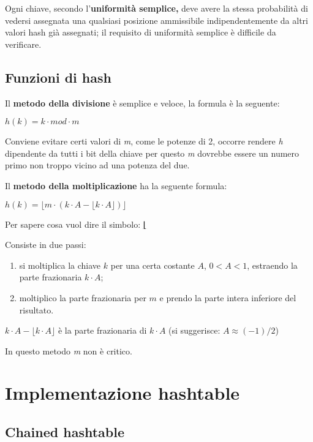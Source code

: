 Ogni chiave, secondo l'\textbf{uniformità semplice,} deve avere la
stessa probabilità di vedersi assegnata una qualsiasi posizione
ammissibile indipendentemente da altri valori hash già assegnati; il
requisito di uniformità semplice è difficile da verificare.

\subsection{Funzioni di hash}\label{funzioni-di-hash}

Il \textbf{metodo della divisione} è semplice e veloce, la formula è la
seguente:

\(h(k) = k \cdot mod \cdot m\)

Conviene evitare certi valori di \emph{m}, come le potenze di 2, occorre
rendere \emph{h} dipendente da tutti i bit della chiave per questo
\emph{m} dovrebbe essere un numero primo non troppo vicino ad una
potenza del due.

Il \textbf{metodo della moltiplicazione} ha la seguente formula:

\(h(k) = \lfloor m \cdot (k \cdot A - \lfloor k \cdot A\rfloor)\rfloor\)

Per sapere cosa vuol dire il simbolo:
\href{https://it.wikipedia.org/wiki/Parte_intera}{⌊}

Consiste in due passi:

\begin{enumerate}
\def\labelenumi{\arabic{enumi}.}
\item
  si moltiplica la chiave \(k\) per una certa costante \(A\),
  \(0 < A < 1\), estraendo la parte frazionaria \(k \cdot A\);
\item
  moltiplico la parte frazionaria per \(m\) e prendo la parte intera
  inferiore del risultato.
\end{enumerate}

\(k \cdot A -\)\(\lfloor k \cdot A\rfloor\) è la parte frazionaria di
\(k \cdot A\) (si suggerisce: \(A \approx ( - 1)/2\))

In questo metodo \emph{m} non è critico.

\section{Implementazione hashtable}\label{implementazione-hashtable}

\subsection{Chained hashtable}\label{chained-hashtable}

